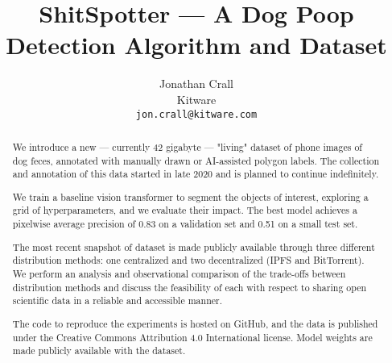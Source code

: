 \documentclass[10pt,twocolumn,letterpaper]{article}
\begin{document}
\title{ShitSpotter --- A Dog Poop Detection Algorithm and Dataset}

\author{Jonathan Crall\\
Kitware\\
{\tt\small jon.crall@kitware.com}
}
\maketitle

\begin{comment}
    cd $HOME/code/shitspotter
    python -m shitspotter.cli.coco_annotation_stats $HOME/data/dvc-repos/shitspotter_dvc/data.kwcoco.json \
        --dst_fpath $HOME/code/shitspotter/coco_annot_stats/stats.json \
        --dst_dpath $HOME/code/shitspotter/coco_annot_stats
\end{comment}

\begin{abstract}

We introduce a new --- currently 42 gigabyte --- "living" dataset of phone
images of dog feces, annotated with manually drawn or AI-assisted polygon
labels.
The collection and annotation of this data started in late 2020 and is planned
to continue indefinitely.

We train a baseline vision transformer to segment the objects of interest, exploring a grid of
  hyperparameters, and we evaluate their impact.
The best model achieves a pixelwise average precision of 0.83 on a validation set and 0.51 on a small test
  set.

The most recent snapshot of dataset is made publicly available through three
different distribution methods: one centralized and two decentralized (IPFS and
BitTorrent).
We perform an analysis and observational comparison of the trade-offs between
distribution methods and discuss the feasibility of each with respect to
sharing open scientific data in a reliable and accessible manner.

The code to reproduce the experiments is hosted on GitHub, and the data is
published under the Creative Commons Attribution 4.0 International license.
Model weights are made publicly available with the dataset.

\end{abstract}
\end{document}
